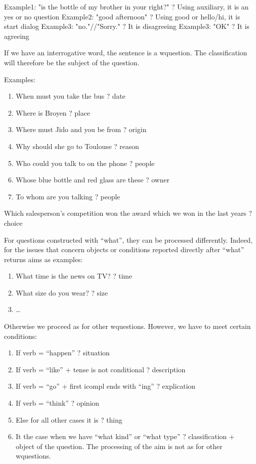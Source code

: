\documentclass[twoside,a4paper,10pt]{report}
\begin{document}
\small
\begin{verbatimtab}
  Example1: "is the bottle of my brother in your right?"
  ? Using auxiliary, it is an yes or no question
  Example2: "good afternoon"
  ? Using good or hello/hi, it is start dialog 
  Example3: "no."//"Sorry."
  ? It is disagreeing
  Example3: "OK"
  ? It is agreeing
\end{verbatimtab}
\normalsize
If we have an interrogative word, the sentence is a w{\textunderscore}question. The classification will therefore be the subject of the question. 

Examples:


\begin{enumerate}    \item  When must you take the bus ? date
    \item  Where is Broyen ? place
    \item  Where must Jido and you be from ? origin
    \item  Why should she go to Toulouse ? reason
    \item  Who could you talk to on the phone ? people
    \item  Whose blue bottle and red glass are these ? owner
    \item  To whom are you talking ? people
\end{enumerate}

Which salesperson's competition won the award which we won in the last years ? choice

For questions constructed with “what”, they can be processed differently. Indeed, for the issues that concern objects or conditions reported directly after “what” returns aims as examples:


\begin{enumerate}    \item  What time is the news on TV? ? time
    \item  What size do you wear? ? size
    \item  \ldots{}
\end{enumerate}

Otherwise we proceed as for other w{\textunderscore}questions. However, we have to meet certain conditions:


\begin{enumerate}    \item  If verb = “happen” ? situation
    \item  If verb = “like” + tense is not conditional ? description
    \item  If verb = “go” + first i{\textunderscore}compl ends with “ing” ? explication
    \item  If verb = “think” ? opinion
    \item  Else for all other cases it is ? thing
    \item  It the case when we have “what kind” or “what type” ? classification + object of the question. The processing of the aim is not as for other w{\textunderscore}questions.
\end{enumerate}
\end{document}
